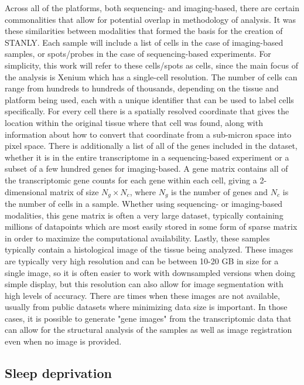 \documentclass{article}
\begin{document}
Across all of the platforms, both sequencing- and imaging-based, there are certain commonalities that allow for potential overlap in methodology of analysis. It was these similarities between modalities that formed the basis for the creation of STANLY. Each sample will include a list of cells in the case of imaging-based samples, or spots/probes in the case of sequencing-based experiments. For simplicity, this work will refer to these cells/spots as cells, since the main focus of the analysis is Xenium which has a single-cell resolution. The number of cells can range from hundreds to hundreds of thousands, depending on the tissue and platform being used, each with a unique identifier that can be used to label cells specifically. For every cell there is a spatially resolved coordinate that gives the location within the original tissue where that cell was found, along with information about how to convert that coordinate from a sub-micron space into pixel space. There is additionally a list of all of the genes included in the dataset, whether it is in the entire transcriptome in a sequencing-based experiment or a subset of a few hundred genes for imaging-based. A gene matrix contains all of the transcriptomic gene counts for each gene within each cell, giving a 2-dimensional matrix of size $N_g \times N_c$, where $N_g$ is the number of genes and $N_c$ is the number of cells in a sample. Whether using sequencing- or imaging-based modalities, this gene matrix is often a very large dataset, typically containing millions of datapoints which are most easily stored in some form of sparse matrix in order to maximize the computational availability. Lastly, these samples typically contain a histological image of the tissue being analyzed. These images are typically very high resolution and can be between 10-20 GB in size for a single image, so it is often  easier to work with downsampled versions when doing simple display, but this resolution can also allow for image segmentation with high levels of accuracy. There are times when these images are not available, usually from public datasets where minimizing data size is important. In those cases, it is possible to generate "gene images" from the transcriptomic data that can allow for the structural analysis of the samples as well as image registration even when no image is provided.

\subsection{Sleep deprivation}
\end{document}
